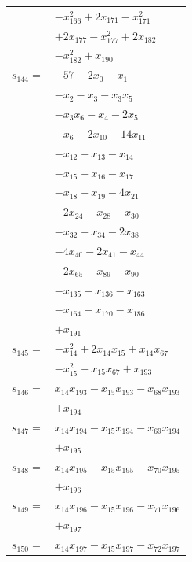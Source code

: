 \begin{longtable}{@{}r@{\;}l@{}}
 & \(\displaystyle -x_{166}^{2} +2x_{171} -x_{171}^{2}\) \\
 & \(\displaystyle +2x_{177} -x_{177}^{2} +2x_{182}\) \\
 & \(\displaystyle -x_{182}^{2} +x_{190}\) \\[3pt]
\(s_{144}=\) & \(\displaystyle -57 -2x_{0} -x_{1}\) \\
 & \(\displaystyle -x_{2} -x_{3} -x_{3}x_{5}\) \\
 & \(\displaystyle -x_{3}x_{6} -x_{4} -2x_{5}\) \\
 & \(\displaystyle -x_{6} -2x_{10} -14x_{11}\) \\
 & \(\displaystyle -x_{12} -x_{13} -x_{14}\) \\
 & \(\displaystyle -x_{15} -x_{16} -x_{17}\) \\
 & \(\displaystyle -x_{18} -x_{19} -4x_{21}\) \\
 & \(\displaystyle -2x_{24} -x_{28} -x_{30}\) \\
 & \(\displaystyle -x_{32} -x_{34} -2x_{38}\) \\
 & \(\displaystyle -4x_{40} -2x_{41} -x_{44}\) \\
 & \(\displaystyle -2x_{65} -x_{89} -x_{90}\) \\
 & \(\displaystyle -x_{135} -x_{136} -x_{163}\) \\
 & \(\displaystyle -x_{164} -x_{170} -x_{186}\) \\
 & \(\displaystyle +x_{191}\) \\[3pt]
\(s_{145}=\) & \(\displaystyle -x_{14}^{2} +2x_{14}x_{15} +x_{14}x_{67}\) \\
 & \(\displaystyle -x_{15}^{2} -x_{15}x_{67} +x_{193}\) \\[3pt]
\(s_{146}=\) & \(\displaystyle x_{14}x_{193} -x_{15}x_{193} -x_{68}x_{193}\) \\
 & \(\displaystyle +x_{194}\) \\[3pt]
\(s_{147}=\) & \(\displaystyle x_{14}x_{194} -x_{15}x_{194} -x_{69}x_{194}\) \\
 & \(\displaystyle +x_{195}\) \\[3pt]
\(s_{148}=\) & \(\displaystyle x_{14}x_{195} -x_{15}x_{195} -x_{70}x_{195}\) \\
 & \(\displaystyle +x_{196}\) \\[3pt]
\(s_{149}=\) & \(\displaystyle x_{14}x_{196} -x_{15}x_{196} -x_{71}x_{196}\) \\
 & \(\displaystyle +x_{197}\) \\[3pt]
\(s_{150}=\) & \(\displaystyle x_{14}x_{197} -x_{15}x_{197} -x_{72}x_{197}\) \\

\end{longtable}
